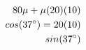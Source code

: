 \documentclass[preview]{standalone}
\begin{document}
\begin{align*}
\special{dvisvgm:raw <g id='unique000'>}80\mu + \mu(20)(10)\\cos(37^{\circ}) = 20(10)\\sin(37^{\circ})\special{dvisvgm:raw </g>}
\end{align*}
\end{document}
